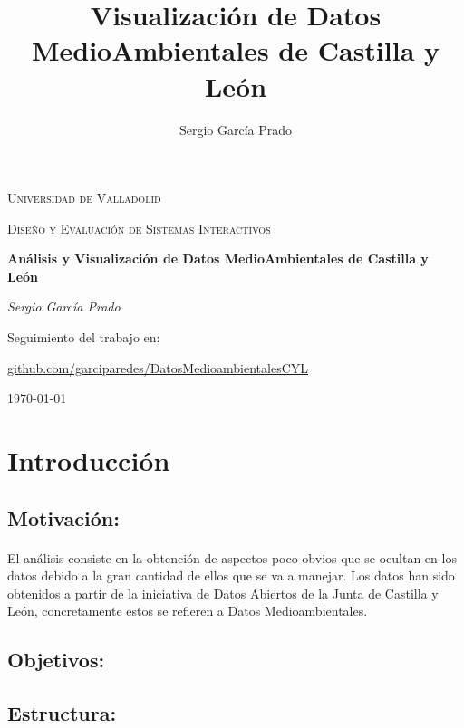 \documentclass{article}
\title{Visualización de Datos MedioAmbientales de Castilla y León}
\author{Sergio García Prado}
\begin{document}
	\begin{titlepage}
		\centering
		{\scshape\LARGE Universidad de Valladolid \par}
		\vspace{1cm}
		{\scshape\Large Diseño y Evaluación de Sistemas Interactivos\par}
		\vspace{1.5cm}
		{\huge\bfseries Análisis y Visualización de Datos MedioAmbientales de Castilla y León\par}
		\vspace{2cm}
		{\Large\itshape Sergio García Prado\par}
	
		\vfill
		Seguimiento del trabajo en: \par
		\href{https://github.com/garciparedes/DatosMedioambientalesCYL}{github.com/garciparedes/DatosMedioambientalesCYL}
		\vfill


		{\large \today\par}
	\end{titlepage}



	\newpage
		\tableofcontents
	\newpage


	\section{Introducción}

		\subsection{Motivación:}

			\paragraph{}
			El análisis consiste en la obtención de aspectos poco obvios que se ocultan en los datos debido a la gran cantidad de ellos que se va a manejar. Los datos han sido obtenidos a partir de la iniciativa de Datos Abiertos de la Junta de Castilla y León, concretamente estos se refieren a Datos Medioambientales.
		
		
		\subsection{Objetivos:}
		
		
		\subsection{Estructura:}
\end{document}
